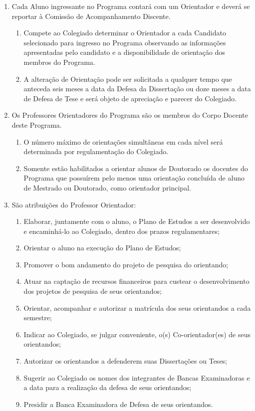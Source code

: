 \documentclass{article}
\newcommand{\grupoMenor}{Colegiado\xspace}
\begin{document}
\begin{enumerate}
	\item Cada Aluno ingressante no Programa contará com um Orientador e deverá se reportar à Comissão de Acompanhamento Discente.
	\begin{enumerate}
		\item Compete ao \grupoMenor determinar o Orientador a cada Candidato selecionado para ingresso no Programa observando as informações apresentadas pelo candidato e a disponibilidade de orientação dos membros do Programa.
		\item A alteração de Orientação pode ser solicitada a qualquer tempo que anteceda seis meses a data da Defesa da Dissertação ou doze meses a data de Defesa de Tese e será objeto de apreciação e parecer do \grupoMenor.
	\end{enumerate}

	\item Os Professores Orientadores do Programa são os membros do Corpo Docente deste Programa. 
	\begin{enumerate}
		\item O número máximo de orientações simultâneas em cada nível será determinada por regulamentação do \grupoMenor.
		\item Somente estão habilitados a orientar alunos de Doutorado os docentes do Programa que possuírem pelo menos uma orientação concluída de aluno de Mestrado ou Doutorado, como orientador principal.
	\end{enumerate}

	\item  São atribuições do Professor Orientador:
	\begin{enumerate}[label=\Roman*]
		\item 	Elaborar, juntamente com o aluno, o Plano de Estudos a ser desenvolvido e encaminhá-lo ao \grupoMenor, dentro dos prazos regulamentares;
		\item	Orientar o aluno na execução do Plano de Estudos;
		\item	Promover o bom andamento do projeto de pesquisa do orientando;
		\item	Atuar na captação de recursos financeiros para custear o desenvolvimento dos projetos de pesquisa de seus orientandos;
		\item	Orientar, acompanhar e autorizar a matrícula dos seus orientandos a cada semestre;
		\item	Indicar ao \grupoMenor, se julgar conveniente, o(s) Co-orientador(es) de seus orientandos;
		\item	Autorizar os orientandos a defenderem suas Dissertações ou Teses;
		\item	Sugerir ao \grupoMenor os nomes dos integrantes de Bancas Examinadoras e a data para a realização da defesa de seus orientandos;
		\item	Presidir a Banca Examinadora de Defesa de seus orientandos.
	\end{enumerate}


\end{enumerate}
\end{document}
